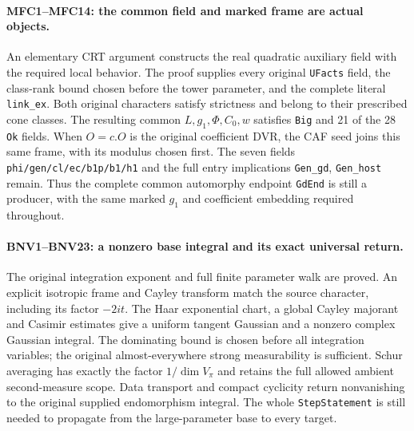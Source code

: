 \documentclass[11pt,a4paper]{article}
\numberwithin{equation}{section}
\theoremstyle{remark}\newtheorem{remark}[theorem]{Remark}
\begin{document}
\paragraph{MFC1--MFC14: the common field and marked frame are actual objects.}
An elementary CRT argument constructs the real quadratic auxiliary field
with the required local behavior. The proof supplies every original
\texttt{UFacts} field, the class-rank bound chosen before the tower
parameter, and the complete literal \texttt{link\_\allowbreak ex}. Both original
characters satisfy strictness and belong to their prescribed cone
classes. The resulting common $L,g_1,\Phi,C_0,w$ satisfies
\texttt{Big} and 21 of the 28 \texttt{Ok} fields. When $O=c.O$ is
the original coefficient DVR, the CAF seed joins this same frame,
with its modulus chosen first.
The seven fields \texttt{phi/\allowbreak gen/\allowbreak cl/\allowbreak ec/\allowbreak b1p/\allowbreak b1/\allowbreak h1} and the full entry
implications \texttt{Gen\_\allowbreak gd}, \texttt{Gen\_\allowbreak host} remain. Thus
the complete common automorphy endpoint \texttt{Gd\allowbreak End} is still a
producer, with the same marked $g_1$ and coefficient embedding required
throughout.

\paragraph{BNV1--BNV23: a nonzero base integral and its exact universal return.}
The original integration exponent and full finite parameter walk are
proved. An explicit isotropic frame and Cayley transform match the
source character, including its factor $-2it$. The Haar exponential
chart, a global Cayley majorant and Casimir estimates give a uniform
tangent Gaussian and a nonzero complex Gaussian integral. The
dominating bound is chosen before all integration variables; the
original almost-everywhere strong measurability is sufficient. Schur
averaging has exactly the factor $1/\dim V_\pi$ and retains the full
allowed ambient second-measure scope. Data transport and compact
cyclicity return nonvanishing to the original supplied endomorphism
integral. The whole \texttt{Step\allowbreak Statement} is still needed to
propagate from the large-parameter base to every target.
\end{document}
